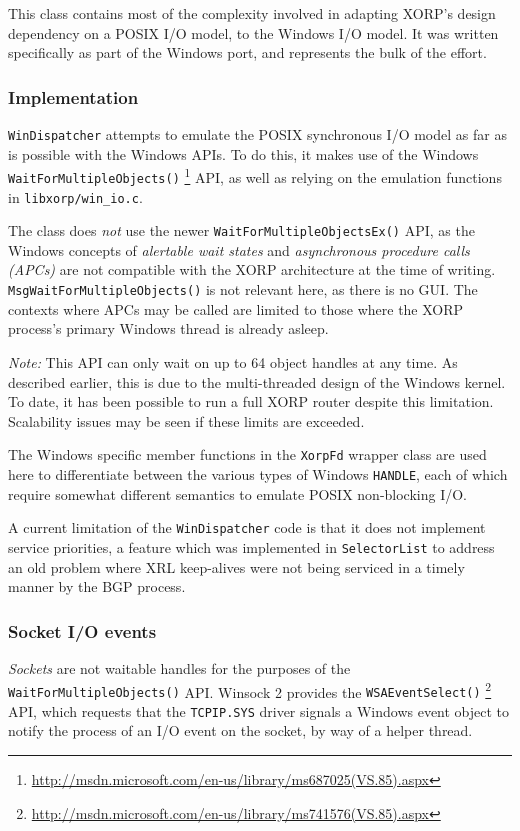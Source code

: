 \documentclass[11pt]{article}
\begin{document}
{This class contains most of the complexity involved in adapting
XORP's design dependency on a POSIX I/O model, to the Windows I/O model.
It was written specifically as part of the Windows port, and represents
the bulk of the effort.

\subsubsection{Implementation}

{\tt WinDispatcher} attempts to emulate the POSIX synchronous I/O model as far as
is possible with the Windows APIs.
To do this, it makes use of the Windows
{\tt WaitForMultipleObjects()}
\footnote{\url{http://msdn.microsoft.com/en-us/library/ms687025(VS.85).aspx}}
API, as well as relying on the emulation functions in {\tt libxorp/win\_io.c}.

The class does {\em not} use the newer
{\tt WaitForMultipleObjectsEx()}
API, as the Windows concepts of
{\em alertable wait states} and
{\em asynchronous procedure calls (APCs)}
are not compatible with the XORP architecture
at the time of writing.
{\tt MsgWaitForMultipleObjects()} is not
relevant here, as there is no GUI.
The contexts where APCs may be called are limited
to those where the XORP process's primary
Windows thread is already asleep.

{\em Note:} This API can only wait on up to 64 object handles at any time.
As described earlier, this is due to the multi-threaded design
of the Windows kernel.
To date, it has been possible to run a full XORP router
despite this limitation.
Scalability issues may be seen if these limits
are exceeded.

The Windows specific member functions in the
{\tt XorpFd}
wrapper class are used here to differentiate
between the various types of Windows
{\tt HANDLE}, each of which require somewhat different
semantics to emulate POSIX non-blocking I/O.

A current limitation of the
{\tt WinDispatcher} code is that it does not
implement service priorities, a feature
which was implemented in
{\tt SelectorList} to address an old problem where
XRL keep-alives were not being serviced in
a timely manner by the BGP process.

\subsubsection{Socket I/O events}

{\em Sockets} are not waitable handles for the purposes of the
{\tt WaitForMultipleObjects()} API.
Winsock 2 provides the {\tt WSAEventSelect()}
\footnote{\url{http://msdn.microsoft.com/en-us/library/ms741576(VS.85).aspx}}
API, which requests that
the {\tt TCPIP.SYS} driver signals a Windows event object to
notify the process of an I/O event on the socket, by
way of a helper thread.

}
\end{document}
